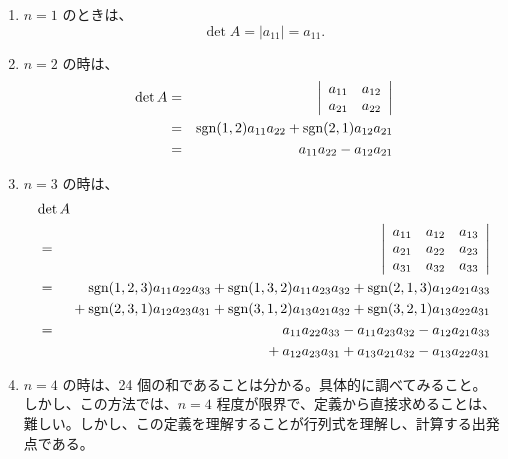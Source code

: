 \begin{enumerate}
\item $n = 1$ のときは、
$$\det A = |a_{11}| = a_{11}.$$

\item $n = 2$ の時は、
\begin{eqnarray*}
\det A  & = & \left|\begin{array}{cc}a_{11} & a_{12}\\ a_{21} & a_{22}\end{array}\right| \\
& = & \mbox{{\rm sgn}}(1,2)a_{11}a_{22} + \mbox{{\rm sgn}}(2,1)a_{12}a_{21}\\
& = & a_{11}a_{22} - a_{12}a_{21}
\end{eqnarray*}

\item $n =3$ の時は、
\begin{eqnarray*}
\lefteqn{\det A}\\
& = & \left|\begin{array}{ccc}a_{11} & a_{12} & a_{13} \\ a_{21} & 
a_{22} & a_{23} \\ a_{31} & a_{32} & a_{33}\end{array}\right| \\
& = & \sgn(1,2,3)a_{11}a_{22}a_{33} + \sgn(1,3,2)a_{11}a_{23}a_{32} + 
\sgn(2,1,3)a_{12}a_{21}a_{33}\\
& & \mbox{ } + \sgn(2,3,1)a_{12}a_{23}a_{31} + \sgn(3,1,2)a_{13}a_{21}a_{32} + 
\sgn(3,2,1)a_{13}a_{22}a_{31}\\
& = & a_{11}a_{22}a_{33} - a_{11}a_{23}a_{32} - a_{12}a_{21}a_{33}\\
& & \mbox{ } + a_{12}a_{23}a_{31} + a_{13}a_{21}a_{32} - a_{13}a_{22}a_{31}
\end{eqnarray*}

\item $n = 4$ の時は、24 個の和であることは分かる。具体的に調べてみること。
しかし、この方法では、$n = 4$ 程度が限界で、定義から直接求めることは、難しい。しかし、この定義を理解することが行列式を理解し、計算する出発点である。
\end{enumerate}

